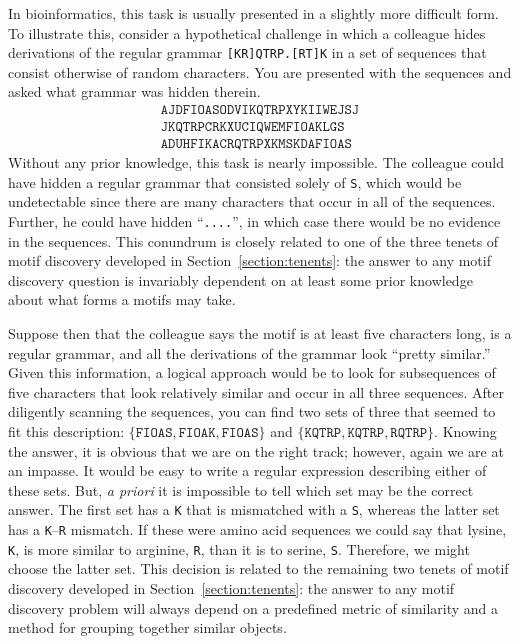    In bioinformatics, this task is usually presented in a slightly
    more difficult form.  To illustrate this, consider a
    hypothetical challenge in which a colleague hides derivations of
    the regular grammar \texttt{[KR]QTRP.[RT]K} in a set of
    sequences that consist otherwise of random characters.  You are
    presented with the sequences and asked what grammar was hidden
    therein.
    \begin{equation}\label{eqn:hidden1}
        \begin{split}
          \texttt{AJDFIOASODVIKQTRPXYKIIWEJSJ} \\
          \texttt{JKQTRPCRKXUCIQWEMFIOAKLGS} \\
          \texttt{ADUHFIKACRQTRPXKMSKDAFIOAS}
        \end{split}
    \end{equation}
    Without any prior knowledge, this task is nearly impossible.
    The colleague could have hidden a regular grammar that consisted
    solely of \texttt{S}, which would be undetectable since there are many characters
    that occur in all of the sequences.  Further, he could have hidden ``\texttt{....}'',
    in which case there would be no evidence in the sequences.
    This conundrum is closely related to one of the three tenets
    of motif discovery
    developed in Section~\vref{section:tenents}: the answer to any
    motif discovery question is invariably dependent on at least
    some prior knowledge about what forms a motifs may take.

    Suppose then that the colleague says the motif is at least five
    characters long, is a regular grammar, and all the derivations
    of the grammar look ``pretty similar.''  Given this
    information, a logical approach would be to look for
    subsequences of five characters that look relatively similar and
    occur in all three sequences.  After diligently scanning the
    sequences, you can find two sets of three that seemed to fit
    this description: $\{\texttt{FIOAS}, \texttt{FIOAK},
    \texttt{FIOAS}\}$ and $\{\texttt{KQTRP}, \texttt{KQTRP},
    \texttt{RQTRP}\}$.  Knowing the answer, it is obvious that we
    are on the right track; however, again we are at an impasse.
    It would be easy to write a regular expression describing either
    of these sets.  But, \emph{a priori} it is impossible to tell
    which set may be the correct answer.  The first set has a \texttt{K}
    that is mismatched with a \texttt{S}, whereas the latter set has
    a \texttt{K}--\texttt{R} mismatch.  If these were amino acid
    sequences we could say that lysine, \texttt{K}, is more similar
    to arginine, \texttt{R}, than it is to serine, \texttt{S}.
    Therefore, we might choose the latter set.  This decision is
    related to the remaining two tenets of motif discovery developed
    in Section~\ref{section:tenents}: the answer to any motif
    discovery problem will always depend on a predefined metric of
    similarity and a method for grouping together similar objects.


